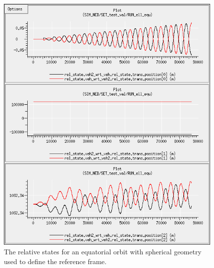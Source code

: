 \begin{description}
\begin{figure}[!ht]
\begin{center}
\includegraphics[width=5in]{figures/ned_equ_sph.jpg}
\caption{The relative states for an equatorial orbit with spherical geometry used to define the reference frame.}
\label{fig:nedequsph}
\end{center}
\end{figure}

\end{description}



